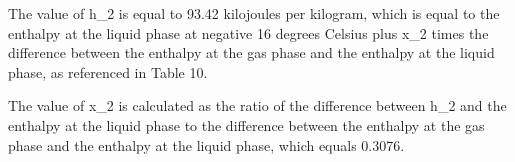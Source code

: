 The value of h_2 is equal to 93.42 kilojoules per kilogram, which is equal to the enthalpy at the liquid phase at negative 16 degrees Celsius plus x_2 times the difference between the enthalpy at the gas phase and the enthalpy at the liquid phase, as referenced in Table 10.

The value of x_2 is calculated as the ratio of the difference between h_2 and the enthalpy at the liquid phase to the difference between the enthalpy at the gas phase and the enthalpy at the liquid phase, which equals 0.3076.